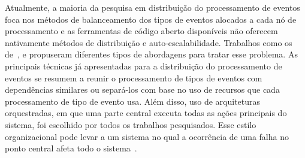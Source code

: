 



Atualmente, a maioria da pesquisa em distribuição do processamento de eventos foca nos métodos de balanceamento dos tipos de eventos alocados a cada nó de processamento e as ferramentas de código aberto disponíveis não oferecem nativamente métodos de distribuição e auto-escalabilidade. Trabalhos como os de~\cite{Isoyama:2012:SCE:2335484.2335498}, \cite{6906776} e \cite{Balkesen:2013:RRI:2488222.2488257} propuseram diferentes tipos de abordagens para tratar esse problema. As principais técnicas já apresentadas para a distribuição do processamento de eventos se resumem a reunir o processamento de tipos de eventos com dependências similares ou separá-los com base no uso de recursos que cada processamento de tipo de evento usa. Além disso, uso de arquiteturas orquestradas, em que uma parte central executa todas as ações principais do sistema, foi escolhido por todos os trabalhos pesquisados. Esse estilo organizacional pode levar a um sistema no qual a ocorrência de uma falha no ponto central afeta todo o sistema~\citep{Newman:2015:BM:2904388}. 





